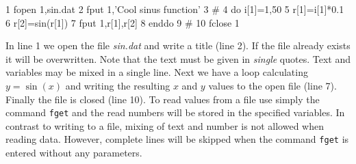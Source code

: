 \begin{MacVerbatim}
      1  fopen 1,sin.dat
      2  fput 1,'Cool sinus function'
      3  #
      4  do i[1]=1,50
      5    r[1]=i[1]*0.1
      6    r[2]=sin(r[1])
      7    fput 1,r[1],r[2]
      8  enddo
      9  #
     10  fclose 1
\end{MacVerbatim}

In line 1 we open the file {\it sin.dat} and write a title (line 2).
If the file already exists it will be overwritten. Note that the
text must be given in {\it single} quotes. Text and variables may be
mixed in a single line. Next we have a loop calculating $y=\sin(x)$
and writing the resulting $x$ and $y$ values to the open file (line
7). Finally the file is closed (line 10). To read values from a file
use simply the command {\tt fget} and the read numbers will be
stored in the specified variables. In contrast to writing to a file,
mixing of text and number is not allowed when reading data. However,
complete lines will be skipped when the command {\tt fget} is
entered without any parameters.

